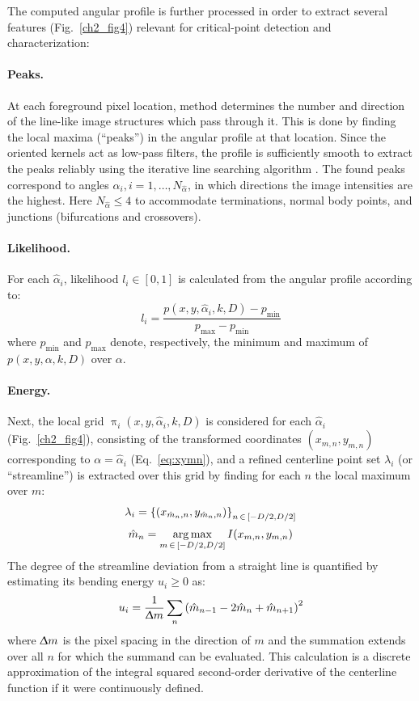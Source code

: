 The computed angular profile is further processed in order to extract several features (Fig.~\ref{ch2_fig4}) relevant for critical-point detection and characterization:

\paragraph{Peaks.} At each foreground pixel location, method determines the number and direction of the line-like image structures which pass through it. This is done by finding the local maxima (``peaks'') in the angular profile at that location. Since the oriented kernels act as low-pass filters, the profile is sufficiently smooth to extract the peaks reliably using the iterative line searching algorithm \cite{flannery1992numerical}. The found peaks correspond to angles $\hat{\alpha}_{i}, i=1,\dots,N_{\hat{\alpha}}$, in which directions the image intensities are the highest. Here $N_{\hat{\alpha}}\leq 4$ to accommodate terminations, normal body points, and junctions (bifurcations and crossovers).

\paragraph{Likelihood.} For each $\hat{\alpha}_{i}$, likelihood $l_i \in \left[ 0, 1 \right]  $ is calculated from the angular profile according to:
\begin{equation} 
l_i = \frac{p(x,y,\hat{\alpha}_{i},k,D)-p_{\min}}{p_{\max}-p_{\min}}
\end{equation}
where $p_{\min}$ and $p_{\max}$ denote, respectively, the minimum and maximum of $p(x,y,\alpha,k,D)$ over $\alpha$.

\paragraph{Energy.} Next, the local grid $\uppi_{i}(x,y,\hat{\alpha}_{i},k,D)$ is considered for each $\hat{\alpha}_{i}$ (Fig.~\ref{ch2_fig4}), consisting of the transformed coordinates $(x_{m,n},y_{m,n})$ corresponding to $\alpha=\hat{\alpha}_{i}$ (Eq.~\ref{eq:xymn}), and a refined centerline point set $\lambda_{i}$ (or ``streamline'') is extracted over this grid by finding for each $n$ the local maximum over $m$:
\begin{gather}
\label{ch2:eq:refine-centerline} 
\lambda_{i} = \left\{(x_{\hat{m}_{n},n},y_{\hat{m}_{n},n})\right\}_{n\,\in\,\left[-D/2,D/2\right]}\\[0.5ex]
\hat{m}_{n} = \operatorname*{arg\,max}_{m\,\in\,\left[-D/2,D/2\right]} I(x_{m,n},y_{m,n})
\label{eq:hatm}
\end{gather}
The degree of the streamline deviation from a straight line is quantified by estimating its bending energy $u_{i}\geq0$ as:
\begin{equation}
u_{i} = \frac{1}{\Updelta m}\sum_{n} \left( \hat{m}_{n-1} - 2\hat{m}_{n} + \hat{m}_{n+1} \right)^2
\end{equation}
where $\Updelta m$ is the pixel spacing in the direction of $m$ and the summation extends over all $n$ for which the summand can be evaluated. This calculation is a discrete approximation of the integral squared second-order derivative of the centerline function if it were continuously defined.


